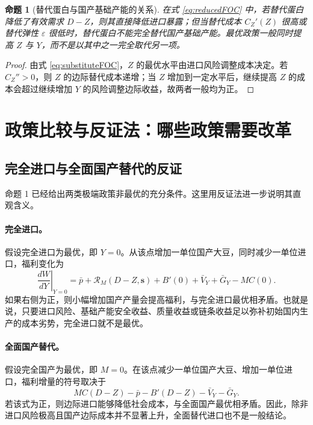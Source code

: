 \documentclass[UTF8,zihao=-4,fontset=fandol]{ctexart}
\numberwithin{equation}{section}
\newtheorem{proposition}{命题}
\theoremstyle{definition}
\theoremstyle{remark}
\begin{document}
\begin{proposition}[替代蛋白与国产基础产能的关系]
在式 \eqref{eq:reducedFOC} 中，若替代蛋白降低了有效需求 $D-Z$，则其直接降低进口暴露；但当替代成本 $C_Z'(Z)$ 很高或替代弹性 $\varepsilon$ 很低时，替代蛋白不能完全替代国产基础产能。最优政策一般同时提高 $Z$ 与 $Y$，而不是以其中之一完全取代另一项。
\end{proposition}

\begin{proof}
由式 \eqref{eq:substituteFOC}，$Z$ 的最优水平由进口风险调整成本决定。若 $C_Z''>0$，则 $Z$ 的边际替代成本递增；当 $Z$ 增加到一定水平后，继续提高 $Z$ 的成本会超过继续增加 $Y$ 的风险调整边际收益，故两者一般均为正。\end{proof}

\section{政策比较与反证法：哪些政策需要改革}

\subsection{完全进口与全面国产替代的反证}

命题 1 已经给出两类极端政策非最优的充分条件。这里用反证法进一步说明其直观含义。

\paragraph{完全进口。} 假设完全进口为最优，即 $Y=0$。从该点增加一单位国产大豆，同时减少一单位进口，福利变化为
\begin{equation}
 \left.\frac{dW}{dY}\right|_{Y=0}=\bar p+\mathcal{R}_M(D-Z,\bm s)+B'(0)+\bar V_Y+\bar G_Y-MC(0).
 \label{eq:allimport}
\end{equation}
如果右侧为正，则小幅增加国产产量会提高福利，与完全进口最优相矛盾。也就是说，只要进口风险、基础产能安全收益、质量收益或链条收益足以弥补初始国内生产的成本劣势，完全进口就不是最优。

\paragraph{全面国产替代。} 假设完全国产为最优，即 $M=0$。在该点减少一单位国产大豆、增加一单位进口，福利增量的符号取决于
\begin{equation}
 MC(D-Z)-\bar p-B'(D-Z)-\bar V_Y-\bar G_Y.
 \label{eq:allhome}
\end{equation}
若该式为正，则边际进口能够降低社会成本，与全面国产最优相矛盾。因此，除非进口风险极高且国产边际成本并不显著上升，全面替代进口也不是一般结论。
\end{document}
